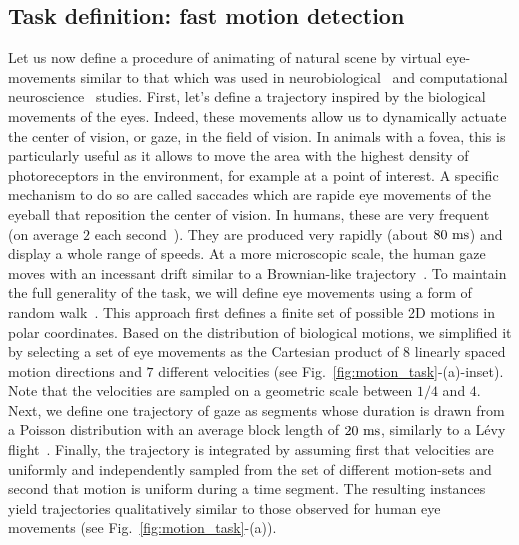\documentclass[default]{sn-jnl}%
\theoremstyle{thmstyleone}%
\theoremstyle{thmstyletwo}%
\theoremstyle{thmstylethree}%
\newcommand{\seeFig}[1]{see Fig.~\ref{fig:#1}}%
\begin{document}
\subsection{Task definition: fast motion detection}
Let us now define a procedure of animating of natural scene by virtual eye-movements  similar to that which was used in neurobiological~\citep{vinje_sparse_2000, baudot_animation_2013} and computational neuroscience~\citep{kremkow_push-pull_2016} studies. First, let's define a trajectory inspired by the biological movements of the eyes. Indeed, these movements allow us to dynamically actuate the center of vision, or gaze, in the field of vision. In animals with a fovea, this is particularly useful as it allows to move the area with the highest density of photoreceptors in the environment, for example at a point of interest. A specific mechanism to do so are called saccades which are rapide eye movements of the eyeball that reposition the center of vision. In humans, these are very frequent (on average $2$ each second~\citep{dandekar_neural_2012}). They are produced very rapidly (about $80~\si{\milli\second}$) and display a whole range of speeds. At a more microscopic scale, the human gaze moves with an incessant drift similar to a Brownian-like trajectory~\citep{poletti_head-eye_2015}. To maintain the full generality of the task, we will define eye movements using a form of random walk~\citep{engbert_integrated_2011}. This approach first defines a finite set of possible 2D motions in polar coordinates. Based on the distribution of biological motions, we simplified it by selecting a set of eye movements as the Cartesian product of %
$8$ linearly spaced motion directions and %
$7$ different velocities (\seeFig{motion_task}-(a)-inset). Note that the velocities are sampled on a geometric scale between $1/4$ and $4$. Next, we define one trajectory of gaze as segments whose duration is drawn from a Poisson distribution with an average block length of $20~\si{\milli\second}$, similarly to a Lévy flight~\citep[p. 289]{mandelbrot_fractal_1982}. Finally, the trajectory is integrated by assuming first that velocities are uniformly and independently sampled from the set of different motion-sets and second that motion is uniform during a time segment. The resulting instances yield trajectories qualitatively similar to those observed for human eye movements (\seeFig{motion_task}-(a)). 
\end{document}

